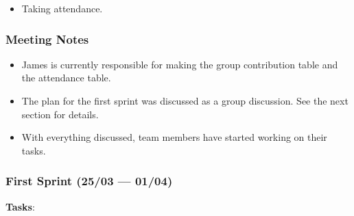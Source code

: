 \documentclass[12pt]{article}
\begin{document}
\begin{itemize}
\tightlist
\item
  Taking attendance.
\end{itemize}

\hypertarget{meeting-notes}{%
\subsubsection{Meeting Notes}\label{meeting-notes}}

\begin{itemize}
\tightlist
\item
  James is currently responsible for making the group contribution table
  and the attendance table.
\item
  The plan for the first sprint was discussed as a group discussion. See
  the next section for details.
\item
  With everything discussed, team members have started working on their
  tasks.
\end{itemize}

\hypertarget{first-sprint-2503-0104}{%
\subsubsection{First Sprint (25/03 ---
01/04)}\label{first-sprint-2503-0104}}

\textbf{Tasks}:
\end{document}
